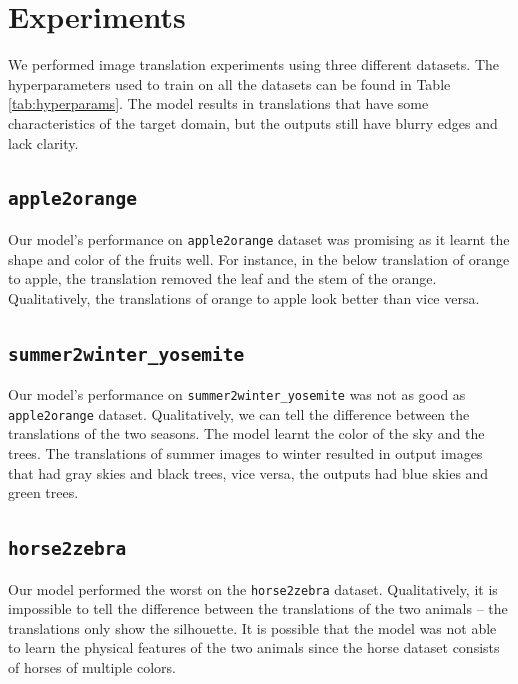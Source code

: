 \documentclass{article}
\begin{document}
\section{Experiments}
We performed image translation experiments using three different datasets. The hyperparameters used to train on all the datasets can be found in Table \ref{tab:hyperparams}. The model results in translations that have some characteristics of the target domain, but the outputs still have blurry edges and lack clarity.
\subsection{\texttt{apple2orange}}
Our model's performance on \texttt{apple2orange} dataset was promising as it learnt the shape and color of the fruits well. For instance, in the below translation of orange to apple, the translation removed the leaf and the stem of the orange. Qualitatively, the translations of orange to apple look better than vice versa.

\subsection{\texttt{summer2winter\_yosemite}}
Our model's performance on \texttt{summer2winter\_yosemite} was not as good as \texttt{apple2orange} dataset. Qualitatively, we can tell the difference between the translations of the two seasons. The model learnt the color of the sky and the trees. The translations of summer images to winter resulted in output images that had gray skies and black trees, vice versa, the outputs had blue skies and green trees.

\subsection{\texttt{horse2zebra}}
Our model performed the worst on the \texttt{horse2zebra} dataset. Qualitatively, it is impossible to tell the difference between the translations of the two animals – the translations only show the silhouette. It is possible that the model was not able to learn the physical features of the two animals since the horse dataset consists of horses of multiple colors.


\end{document}
